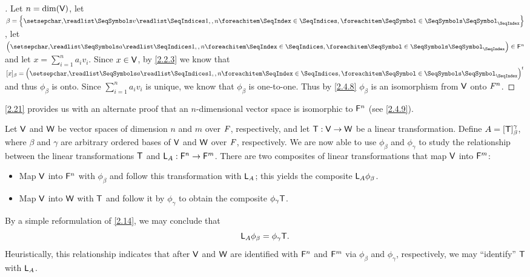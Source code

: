 \begin{proof}[]
  Let \(n = \dim(\mathsf{V})\), let \(\beta = \set{\seq{v}{1,,n}}\), let \(\tuple{a}{1,,n} \in \vs{F}^n\) and let \(x = \sum_{i = 1}^n a_i v_i\).
  Since \(x \in \mathsf{V}\), by \cref{2.2.3} we know that \([x]_{\beta} = \tp{\tuple{a}{1,,n}}\) and thus \(\phi_{\beta}\) is onto.
  Since \(\sum_{i = 1}^n a_i v_i\) is unique, we know that \(\phi_{\beta}\) is one-to-one.
  Thus by \cref{2.4.8} \(\phi_{\beta}\) is an isomorphism from \(\mathsf{V}\) onto \(\mathsf{\mathit{F}}^n\).
\end{proof}

\begin{note}
  \cref{2.21} provides us with an alternate proof that an \(n\)-dimensional vector space is isomorphic to \(\mathsf{F}^n\)
  (see \cref{2.4.9}).
\end{note}

\begin{cor}\label{2.4.12}
  Let \(\mathsf{V}\) and \(\mathsf{W}\) be vector spaces of dimension \(n\) and \(m\) over \(\mathit{F}\), respectively, and let \(\mathsf{T} : \mathsf{V} \to \mathsf{W}\) be a linear transformation.
  Define \(A = [\mathsf{T}]_{\beta}^{\gamma}\), where \(\beta\) and \(\gamma\) are arbitrary ordered bases of \(\mathsf{V}\) and \(\mathsf{W}\) over \(\mathit{F}\), respectively.
  We are now able to use \(\phi_{\beta}\) and \(\phi_{\gamma}\) to study the relationship between the linear transformations \(\mathsf{T}\) and \(\mathsf{L}_A : \mathsf{F}^n \to \mathsf{F}^m\).
  There are two composites of linear transformations that map \(\mathsf{V}\) into \(\mathsf{F}^m\):
  \begin{itemize}
    \item Map \(\mathsf{V}\) into \(\mathsf{F}^n\) with \(\phi_{\beta}\) and follow this transformation with \(\mathsf{L}_A\);
          this yields the composite \(\mathsf{L}_A \phi_{\beta}\).
    \item Map \(\mathsf{V}\) into \(\mathsf{W}\) with \(\mathsf{T}\) and follow it by \(\phi_{\gamma}\) to obtain the composite \(\phi_{\gamma} \mathsf{T}\).
  \end{itemize}
  By a simple reformulation of \cref{2.14}, we may conclude that
  \[
    \mathsf{L}_A \phi_{\beta} = \phi_{\gamma} \mathsf{T}.
  \]
  Heuristically, this relationship indicates that after \(\mathsf{V}\) and \(\mathsf{W}\) are identified with \(\mathsf{F}^n\) and \(\mathsf{F}^m\) via \(\phi_{\beta}\) and \(\phi_{\gamma}\), respectively, we may ``identify'' \(\mathsf{T}\) with \(\mathsf{L}_A\).
\end{cor}

